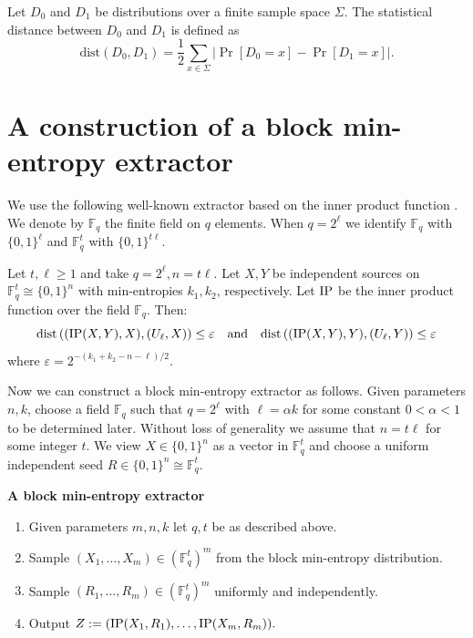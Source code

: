\documentclass{toc}
\def\dist{\mathrm{dist}}
\newcommand{\IP}{\textnormal{IP}}
\newcommand{\F}{\mathbb{F}}
\newcommand{\eps}{\varepsilon}
\begin{document}
\begin{definition}
Let $D_0$ and $D_1$ be distributions over a finite sample space
%
$\Sigma$.   %
The statistical distance between $D_{0}$ and $D_{1}$ is defined as
\[
\dist(D_{0},D_{1}) = 
   \frac{1}{2}\sum_{x\in\Sigma}\big|\Pr[D_{0} = x] - \Pr[D_1 = x]\big|.
\]
\end{definition}


%
%
%


\section{A construction of a block min-entropy extractor} \label{sec:extractor}

We use the following well-known extractor based on the inner product function \cite{chor1988unbiased}. We denote by $\F_q$ the finite field on $q$
elements. When $q=2^{\ell}$ we identify $\F_q$ with $\{0,1\}^{\ell}$ and $\F_q^t$ with $\{0,1\}^{t \ell}$.

\begin{theorem}
\label{strong_ip}
Let $t, \ell \ge 1$ and take $q=2^{\ell}, n =t \ell$. Let $X,Y$ be independent sources on
$\F_q^t \cong \{0,1\}^n$ with min-entropies $k_1,k_2$, respectively. Let $\IP$ be the inner product function over the field $\F_q$. Then:
$$\dist\left((\IP(X,Y), X),(U_\ell, X)\right) \leq \eps \quad \text{and} \quad \dist\left((\IP(X,Y), Y) , (U_\ell, Y)\right) \leq \eps$$
%
%
where $\eps=2^{-(k_1+k_2-n-\ell)/2}$.
\end{theorem}

Now we can construct a block min-entropy extractor as follows. Given parameters $n,k$, choose a field $\F_{q}$ such that
$q=2^{\ell}$ with $\ell=\alpha k$ for some constant $0<\alpha<1$ to be determined later. Without loss of
generality we assume that $n=t \ell$ for some integer $t$. We view $X \in \{0,1\}^n$ as a vector in $\F_q^t$ and choose a uniform independent
seed $R \in \{0, 1\}^n \cong \F_q^t$.

\begin{framed}
\begin{center}
{\bf A block min-entropy extractor}
\end{center}
\begin{enumerate}
\item Given parameters $m,n,k$ let $q,t$ be as described above.
\item Sample $(X_1,\dots,X_m)\in(\F_{q}^{t})^{m}$ from the block min-entropy distribution.
\item Sample $(R_{1},\dots, R_{m}) \in (\F_{q}^{t})^{m}$ uniformly and independently.
\item Output $Z:=(\IP(X_1, R_1),\dots,\IP(X_m, R_m)).$
\end{enumerate}
\end{framed}
\end{document}
